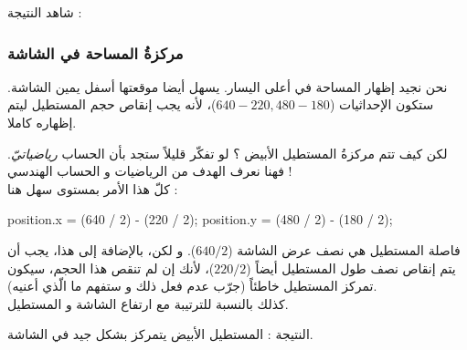 شاهد النتيجة :


\subsubsection{مركزةُ المساحة في الشاشة}

نحن نجيد إظهار المساحة في أعلى اليسار. يسهل أيضا موقعتها أسفل يمين الشاشة. ستكون الإحداثيات
\mbox{($640 - 220, 480 - 180$)}،
لأنه يجب إنقاص حجم المستطيل ليتم إظهاره كاملا. 

لكن كيف تتم مركزةُ المستطيل الأبيض ؟ لو تفكّر قليلاً ستجد بأن الحساب
\textit{رياضياتيّ}.
فهنا نعرف الهدف من الرياضيات و الحساب الهندسي !\\
كلّ هذا الأمر بمستوى سهل هنا :

\begin{Csource}
position.x = (640 / 2) - (220 / 2);
position.y = (480 / 2) - (180 / 2);
\end{Csource}

فاصلة المستطيل هي نصف عرض الشاشة
($640 / 2$).
و لكن، بالإضافة إلى هذا، يجب أن يتم إنقاص نصف طول المستطيل أيضاً 
($220 / 2$)،
لأنك إن لم تنقص هذا الحجم، سيكون تمركز المستطيل خاطئاً (جرّب عدم فعل ذلك و ستفهم ما الّذي أعنيه).\\
كذلك بالنسبة للترتيبة مع ارتفاع الشاشة و المستطيل.

النتيجة : المستطيل الأبيض يتمركز بشكل جيد في الشاشة.

